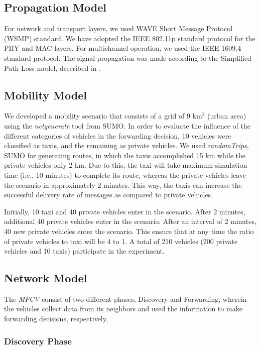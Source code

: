 \documentclass[letterpaper, 10 pt, conference]{ieeeconf}  %
\begin{document}
\subsection{Propagation Model}

For network and transport layers, we used WAVE Short Message Protocol (WSMP) standard. We have adopted the IEEE 802.11p standard protocol for the PHY and MAC layers. For multichannel operation, we used the IEEE 1609.4 standard protocol. The signal propagation was made according to the Simplified Path-Loss model, described in \cite{tse2005}.

\subsection{Mobility Model}

We developed a mobility scenario that consists of a grid of 9 km$^2$ (urban area) using the \emph{netgenerate} tool from SUMO. In order to evaluate the influence of the different categories of vehicles in the forwarding decision, 10 vehicles were classified as taxis, and the remaining as private vehicles. We used \emph{randomTrips}, SUMO for generating routes, in which the taxis accomplished 15 km while the private vehicles only 2 km. Due to this, the taxi will take maximum simulation time (i.e., 10 minutes) to complete its route, whereas the private vehicles leave the scenario in approximately 2 minutes. This way, the taxis can increase the successful delivery rate of messages as compared to private vehicles.

Initially, 10 taxi and 40 private vehicles enter in the scenario. After 2 minutes, additional 40 private vehicles enter in the scenario. After an interval of 2 minutes, 40 new private vehicles enter the scenario. This ensure that at any time the ratio of private vehicles to taxi will be 4 to 1. A total of 210 vehicles (200 private vehicles and 10 taxis) participate in the experiment.

\subsection{Network Model}

The \emph{MFCV} consist of two different phases, Discovery and Forwarding, wherein the vehicles collect data from its neighbors and used the information to make forwarding decisions, respectively.

\subsubsection{Discovery Phase}
\end{document}
